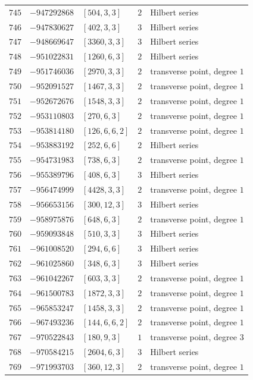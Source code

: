 \documentclass[11pt]{article}
\begin{document}
\begin{center}
\begin{longtable}{r r l c l}
$745$ & $-947292868$ & $[504,3,3]$ & $2$ & Hilbert series\\
$746$ & $-947830627$ & $[402,3,3]$ & $3$ & Hilbert series\\
$747$ & $-948669647$ & $[3360,3,3]$ & $3$ & Hilbert series\\
$748$ & $-951022831$ & $[1260,6,3]$ & $2$ & Hilbert series\\
$749$ & $-951746036$ & $[2970,3,3]$ & $2$ & transverse point, degree $1$\\
$750$ & $-952091527$ & $[1467,3,3]$ & $2$ & transverse point, degree $1$\\
$751$ & $-952672676$ & $[1548,3,3]$ & $2$ & transverse point, degree $1$\\
$752$ & $-953110803$ & $[270,6,3]$ & $2$ & transverse point, degree $1$\\
$753$ & $-953814180$ & $[126,6,6,2]$ & $2$ & transverse point, degree $1$\\
$754$ & $-953883192$ & $[252,6,6]$ & $2$ & Hilbert series\\
$755$ & $-954731983$ & $[738,6,3]$ & $2$ & transverse point, degree $1$\\
$756$ & $-955389796$ & $[408,6,3]$ & $3$ & Hilbert series\\
$757$ & $-956474999$ & $[4428,3,3]$ & $2$ & transverse point, degree $1$\\
$758$ & $-956653156$ & $[300,12,3]$ & $3$ & Hilbert series\\
$759$ & $-958975876$ & $[648,6,3]$ & $2$ & transverse point, degree $1$\\
$760$ & $-959093848$ & $[510,3,3]$ & $3$ & Hilbert series\\
$761$ & $-961008520$ & $[294,6,6]$ & $3$ & Hilbert series\\
$762$ & $-961025860$ & $[348,6,3]$ & $3$ & Hilbert series\\
$763$ & $-961042267$ & $[603,3,3]$ & $2$ & transverse point, degree $1$\\
$764$ & $-961500783$ & $[1872,3,3]$ & $2$ & transverse point, degree $1$\\
$765$ & $-965853247$ & $[1458,3,3]$ & $2$ & transverse point, degree $1$\\
$766$ & $-967493236$ & $[144,6,6,2]$ & $2$ & transverse point, degree $1$\\
$767$ & $-970522843$ & $[180,9,3]$ & $1$ & transverse point, degree $3$\\
$768$ & $-970584215$ & $[2604,6,3]$ & $3$ & Hilbert series\\
$769$ & $-971993703$ & $[360,12,3]$ & $2$ & transverse point, degree $1$\\

\end{longtable}
\end{center}
\end{document}
